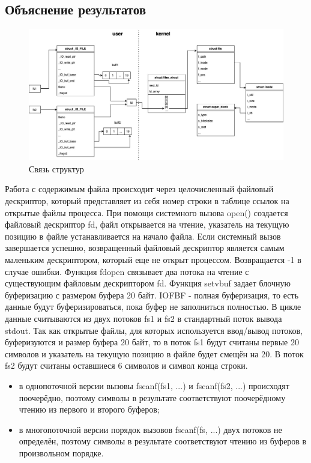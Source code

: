 \subsection*{Объяснение результатов}
\begin{figure}[H]
	\centering
	\includegraphics[scale=0.45]{img/os_lab_05-1.jpg}
	\caption{Связь структур}
	\label{fig:3}
\end{figure}
Работа с содержимым файла происходит через целочисленный файловый дескриптор, который представляет из себя номер строки в таблице ссылок на открытые файлы процесса. При помощи системного вызова open() создается файловый дескриптор fd, файл открывается на чтение, указатель на текущую позицию в файле устанавливается на начало файла. Если системный  вызов  завершается  успешно,  возвращенный  файловый  дескриптор является самым маленьким дескриптором, который еще не открыт  процессом. Возвращается -1 в случае ошибки. Функция fdopen связывает два потока на чтение с существующим файловым дескриптором fd. Функция setvbuf задает блочную буферизацию с размером буфера 20 байт. \underline{ }IOFBF - полная буферизация, то есть данные будут буферизироваться, пока буфер не заполниться полностью. В цикле данные считываются из двух потоков fs1 и fs2 в стандартный поток вывода stdout. Так как открытые файлы, для которых используется ввод/вывод потоков, буферизуются и размер буфера 20 байт, то в поток fs1 будут считаны первые 20 символов и указатель на текущую позицию в файле будет смещён на 20. В поток fs2 будут считаны оставшиеся 6 символов и символ конца строки.

\begin{itemize}
	\item в однопоточной версии вызовы fscanf(fs1, ...) и fscanf(fs2, ...) происходят поочерёдно, поэтому символы в результате соответствуют поочерёдному чтению из первого и второго буферов;
	\item в многопоточной версии порядок вызовов fscanf(fs, ...) двух потоков не определён, поэтому символы в результате соответствуют чтению из буферов в произвольном порядке.
\end{itemize}

